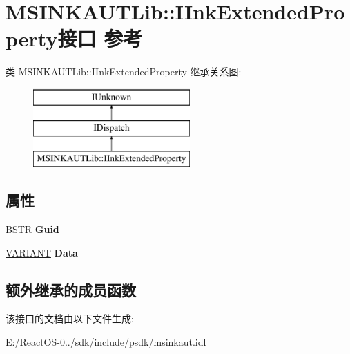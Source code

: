 \hypertarget{interface_m_s_i_n_k_a_u_t_lib_1_1_i_ink_extended_property}{}\section{M\+S\+I\+N\+K\+A\+U\+T\+Lib\+:\+:I\+Ink\+Extended\+Property接口 参考}
\label{interface_m_s_i_n_k_a_u_t_lib_1_1_i_ink_extended_property}
类 M\+S\+I\+N\+K\+A\+U\+T\+Lib\+:\+:I\+Ink\+Extended\+Property 继承关系图\+:\begin{figure}[H]
\begin{center}
\leavevmode
\includegraphics[height=3.000000cm]{interface_m_s_i_n_k_a_u_t_lib_1_1_i_ink_extended_property}
\end{center}
\end{figure}
\subsection*{属性}
\begin{DoxyCompactItemize}
\item 
\mbox{\label{interface_m_s_i_n_k_a_u_t_lib_1_1_i_ink_extended_property_ab1ecc4c3d05516f04c58542069f942c0}} 
B\+S\+TR {\bfseries Guid}
\item 
\mbox{\label{interface_m_s_i_n_k_a_u_t_lib_1_1_i_ink_extended_property_aca0fac07d9eb9a60ed84e14b1d255513}} 
\hyperlink{structtag_v_a_r_i_a_n_t}{V\+A\+R\+I\+A\+NT} {\bfseries Data}
\end{DoxyCompactItemize}
\subsection*{额外继承的成员函数}


该接口的文档由以下文件生成\+:\begin{DoxyCompactItemize}
\item 
E\+:/\+React\+O\+S-\/0../sdk/include/psdk/msinkaut.\+idl\end{DoxyCompactItemize}
